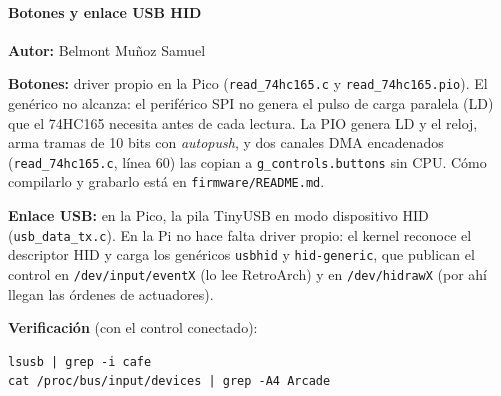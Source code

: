\paragraph{Botones y enlace USB HID}
\textbf{Autor:} Belmont Muñoz Samuel

\textbf{Botones:} driver propio en la Pico (\texttt{read\_74hc165.c} y \texttt{read\_74hc165.pio}). El genérico no alcanza:
el periférico SPI no genera el pulso de carga paralela (LD) que el 74HC165 necesita antes de cada lectura. La PIO genera
LD y el reloj, arma tramas de 10 bits con \textit{autopush}, y dos canales DMA encadenados
(\texttt{read\_74hc165.c}, línea 60) las copian a \texttt{g\_controls.buttons} sin CPU. Cómo compilarlo y grabarlo
está en \texttt{firmware/README.md}.

\textbf{Enlace USB:} en la Pico, la pila TinyUSB en modo dispositivo HID (\texttt{usb\_data\_tx.c}). En la Pi no hace
falta driver propio: el kernel reconoce el descriptor HID y carga los genéricos \texttt{usbhid} y \texttt{hid-generic}, que
publican el control en \texttt{/dev/input/eventX} (lo lee RetroArch) y en \texttt{/dev/hidrawX}
(por ahí llegan las órdenes de actuadores).

\textbf{Verificación} (con el control conectado):
\begin{lstlisting}
lsusb | grep -i cafe
cat /proc/bus/input/devices | grep -A4 Arcade
\end{lstlisting}
